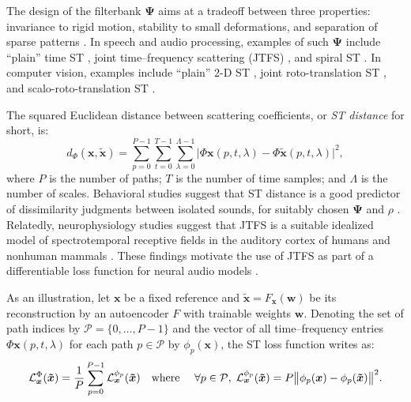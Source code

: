 \documentclass{article} %
\theoremstyle{plain}
\theoremstyle{definition}
\theoremstyle{remark}
\begin{document}
The design of the filterbank $\boldsymbol{\Psi}$ aims at a tradeoff between three properties: invariance to rigid motion, stability to small deformations, and separation of sparse patterns \citep{mallat2016understanding}.
In speech and audio processing, examples of such $\boldsymbol{\Psi}$ include ``plain'' time ST \citep{anden2014deep}, joint time--frequency scattering (JTFS) \citep{anden2014deep}, and spiral ST \citep{lostanlen2016wavelet}.
In computer vision, examples include ``plain'' 2-D ST \citep{bruna2013invariant}, joint roto-translation ST \citep{sifre2013rotation}, and scalo-roto-translation ST \citep{oyallon2014generic}.

The squared Euclidean distance between scattering coefficients, or \emph{ST distance} for short, is:
\begin{equation}
d_{\Phi}(\boldsymbol{x},\boldsymbol{\tilde{x}}) =
\sum_{p=0}^{P-1} \sum_{t=0}^{T-1} \sum_{\lambda=0}^{\Lambda-1}\Big\vert \Phi\boldsymbol{x}(p,t,\lambda) - \Phi\boldsymbol{\tilde{x}}(p,t,\lambda) \Big\vert^2,
\label{eq:scattering-distance}
\end{equation}
where $P$ is the number of paths; $T$ is the number of time samples; and $\Lambda$ is the number of scales.
Behavioral studies suggest that ST distance is a good predictor of dissimilarity judgments between isolated sounds, for suitably chosen $\boldsymbol{\Psi}$ and $\rho$  \citep{patil2012music,lostanlen2021time,tian2025assessing}.
Relatedly, neurophysiology studies suggest that JTFS is a suitable idealized model of spectrotemporal receptive fields in the auditory cortex of humans \citep{norman2018neural} and nonhuman mammals \citep{kowalski1996analysis}.
These findings motivate the use of JTFS as part of a differentiable loss function for neural audio models \citep{vahidi2023mesostructures}.%

As an illustration, let $\boldsymbol{x}$ be a fixed reference and $\boldsymbol{\tilde{x}}=F_{\boldsymbol{x}}(\boldsymbol{w})$ be its reconstruction by an autoencoder $F$ with trainable weights $\boldsymbol{w}$.
Denoting the set of path indices by $\mathcal{P}=\{0,\ldots,P-1\}$ and the vector of all time--frequency entries $\Phi\boldsymbol{x}(p,t,\lambda)$ for each path $p\in\mathcal{P}$ by $\phi_p(\boldsymbol{x})$, the ST loss function  writes as: 
\begin{equation}
\mathcal{L}^{\Phi}_{\boldsymbol{x}}(\boldsymbol{\tilde{x}}) = 
\dfrac{1}{P}
\sum_{p=0}^{P-1} \mathcal{L}^{\phi_p}_{\boldsymbol{x}}(\boldsymbol{\tilde{x}})
\textrm{\quad where \quad}
\forall p\in\mathcal{P},\;
\mathcal{L}^{\phi_p}_{\boldsymbol{x}}(\boldsymbol{\tilde{x}}) =
P
\big\Vert
\phi_p(\boldsymbol{x}) - \phi_p(\boldsymbol{\tilde{x}})
\big\Vert^2.
\label{eq:L-Phi}
\end{equation}
\vspace{-9pt}
\end{document}
